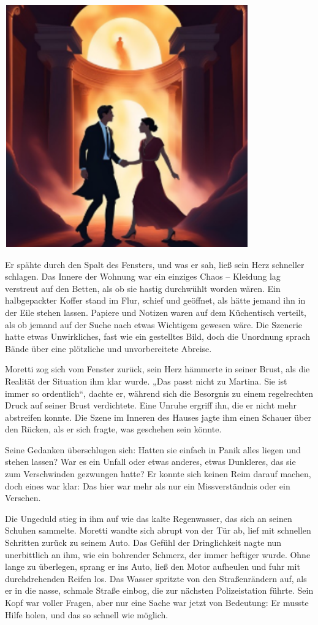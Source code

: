 \documentclass[
]{article}
\begin{document}
\includegraphics[width=4.14583in,height=4.11458in]{media/image8.png}

Er spähte durch den Spalt des Fensters, und was er sah, ließ sein Herz
schneller schlagen. Das Innere der Wohnung war ein einziges Chaos --
Kleidung lag verstreut auf den Betten, als ob sie hastig durchwühlt
worden wären. Ein halbgepackter Koffer stand im Flur, schief und
geöffnet, als hätte jemand ihn in der Eile stehen lassen. Papiere und
Notizen waren auf dem Küchentisch verteilt, als ob jemand auf der Suche
nach etwas Wichtigem gewesen wäre. Die Szenerie hatte etwas
Unwirkliches, fast wie ein gestelltes Bild, doch die Unordnung sprach
Bände über eine plötzliche und unvorbereitete Abreise.

Moretti zog sich vom Fenster zurück, sein Herz hämmerte in seiner Brust,
als die Realität der Situation ihm klar wurde. „Das passt nicht zu
Martina. Sie ist immer so ordentlich``, dachte er, während sich die
Besorgnis zu einem regelrechten Druck auf seiner Brust verdichtete. Eine
Unruhe ergriff ihn, die er nicht mehr abstreifen konnte. Die Szene im
Inneren des Hauses jagte ihm einen Schauer über den Rücken, als er sich
fragte, was geschehen sein könnte.

Seine Gedanken überschlugen sich: Hatten sie einfach in Panik alles
liegen und stehen lassen? War es ein Unfall oder etwas anderes, etwas
Dunkleres, das sie zum Verschwinden gezwungen hatte? Er konnte sich
keinen Reim darauf machen, doch eines war klar: Das hier war mehr als
nur ein Missverständnis oder ein Versehen.

Die Ungeduld stieg in ihm auf wie das kalte Regenwasser, das sich an
seinen Schuhen sammelte. Moretti wandte sich abrupt von der Tür ab, lief
mit schnellen Schritten zurück zu seinem Auto. Das Gefühl der
Dringlichkeit nagte nun unerbittlich an ihm, wie ein bohrender Schmerz,
der immer heftiger wurde. Ohne lange zu überlegen, sprang er ins Auto,
ließ den Motor aufheulen und fuhr mit durchdrehenden Reifen los. Das
Wasser spritzte von den Straßenrändern auf, als er in die nasse, schmale
Straße einbog, die zur nächsten Polizeistation führte. Sein Kopf war
voller Fragen, aber nur eine Sache war jetzt von Bedeutung: Er musste
Hilfe holen, und das so schnell wie möglich.
\end{document}
